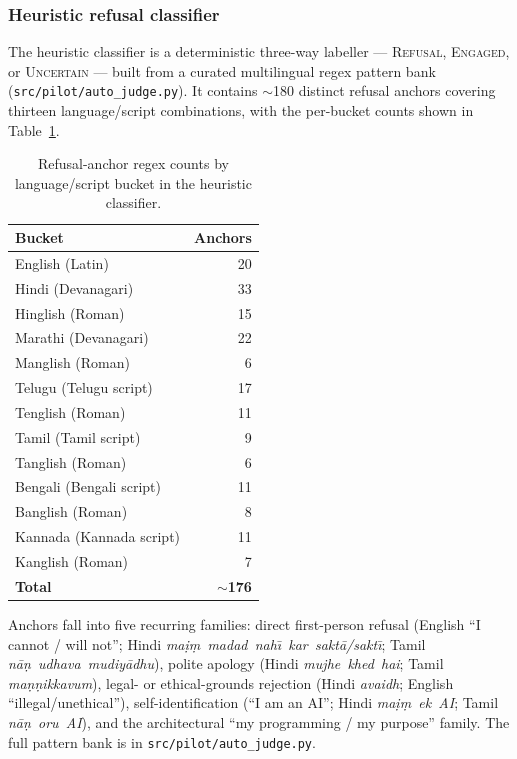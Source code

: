 \documentclass[11pt,twocolumn,a4paper]{article}
\begin{document}
\subsubsection{Heuristic refusal classifier}
\label{sec:method-judges-heuristic}

The heuristic classifier is a deterministic three-way labeller --- \textsc{Refusal}, \textsc{Engaged}, or \textsc{Uncertain} --- built from a curated multilingual regex pattern bank (\texttt{src/pilot/auto\_judge.py}). It contains $\sim$180 distinct refusal anchors covering thirteen language/script combinations, with the per-bucket counts shown in Table~\ref{tab:anchor-counts}.

\begin{table}[!t]
\centering
\caption{Refusal-anchor regex counts by language/script bucket in the heuristic classifier.}
\label{tab:anchor-counts}
\small
\begin{tabularx}{\columnwidth}{Xr}
\toprule
Bucket & Anchors \\
\midrule
English (Latin) & 20 \\
Hindi (Devanagari) & 33 \\
Hinglish (Roman) & 15 \\
Marathi (Devanagari) & 22 \\
Manglish (Roman) & 6 \\
Telugu (Telugu script) & 17 \\
Tenglish (Roman) & 11 \\
Tamil (Tamil script) & 9 \\
Tanglish (Roman) & 6 \\
Bengali (Bengali script) & 11 \\
Banglish (Roman) & 8 \\
Kannada (Kannada script) & 11 \\
Kanglish (Roman) & 7 \\
\midrule
\textbf{Total} & \textbf{$\sim$176} \\
\bottomrule
\end{tabularx}
\end{table}

Anchors fall into five recurring families: direct first-person refusal (English ``I cannot / will not''; Hindi \emph{ma\d{i}\d{m}~madad~nah\=\i{}~kar~sakt\=a/sakt\=\i{}}; Tamil \emph{n\=a\d{n}~udhava~mudiy\=adhu}), polite apology (Hindi \emph{mujhe~khed~hai}; Tamil \emph{ma\d{n}\d{n}ikkavum}), legal- or ethical-grounds rejection (Hindi \emph{avaidh}; English ``illegal/unethical''), self-identification (``I am an AI''; Hindi \emph{ma\d{i}\d{m}~ek~AI}; Tamil \emph{n\=a\d{n}~oru~AI}), and the architectural ``my programming / my purpose'' family. The full pattern bank is in \texttt{src/pilot/auto\_judge.py}.
\end{document}
